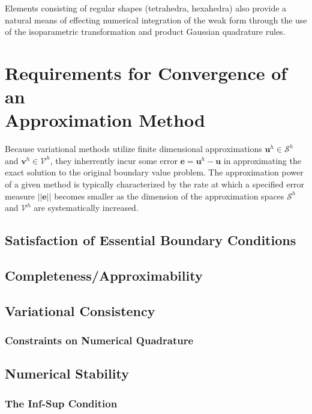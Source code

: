 Elements consisting of regular shapes (tetrahedra, hexahedra) also provide a natural means of effecting numerical integration of the weak form through the use of the isoparametric transformation and product Gaussian quadrature rules.

\section{Requirements for Convergence of an \\ Approximation Method}

Because variational methods utilize finite dimensional approximations $\mathbf{u}^h \in \mathcal{S}^h$ and $\mathbf{v}^h \in \mathcal{V}^h$, they inherrently incur some error $\mathbf{e} = \mathbf{u}^h - \mathbf{u}$ in approximating the exact solution to the original boundary value problem. The  approximation power of a given method is typically characterized by the rate at which a specified error measure $||\mathbf{e}||$ becomes smaller as the dimension of the approximation spaces $\mathcal{S}^h$ and $\mathcal{V}^h$ are systematically increased.

\subsection{Satisfaction of Essential Boundary Conditions}



\subsection{Completeness/Approximability}



\subsection{Variational Consistency}



\subsubsection{Constraints on Numerical Quadrature}



\subsection{Numerical Stability}
\subsubsection{The Inf-Sup Condition}
